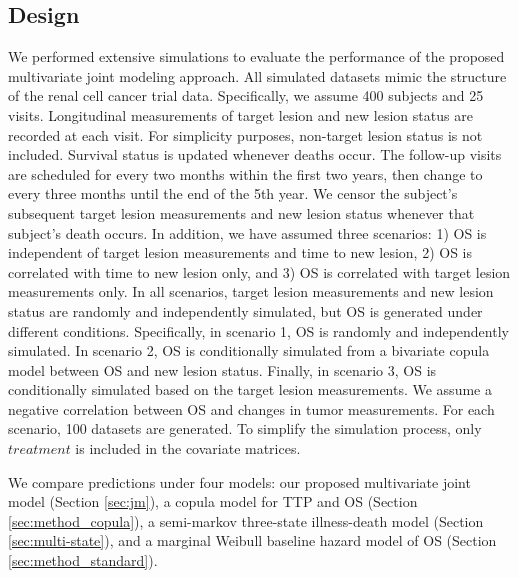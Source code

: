 \subsection{Design}
We performed extensive simulations to evaluate the performance of the proposed multivariate joint modeling approach. All simulated datasets mimic the structure of the renal cell cancer trial data. Specifically, we assume 400 subjects and 25 visits. Longitudinal measurements of target lesion and new lesion status are recorded at each visit. For simplicity purposes, non-target lesion status is not included. Survival status is updated whenever deaths occur. The follow-up visits are scheduled for every two months within the first two years, then change to every three months until the end of the 5th year. We censor the subject's subsequent target lesion measurements and new lesion status whenever that subject's death occurs. In addition, we have assumed three scenarios: 1) \ac{OS} is independent of target lesion measurements and time to new lesion, 2) \ac{OS} is correlated with time to new lesion only, and 3) \ac{OS} is correlated with target lesion measurements only. In all scenarios, target lesion measurements and new lesion status are randomly and independently simulated, but \ac{OS} is generated under different conditions. Specifically, in scenario 1, \ac{OS} is randomly and independently simulated. In scenario 2, \ac{OS} is conditionally simulated from a bivariate copula model between \ac{OS} and new lesion status. Finally, in scenario 3, \ac{OS} is conditionally simulated based on the target lesion measurements. We assume a negative correlation between \ac{OS} and changes in tumor measurements. For each scenario, 100 datasets are generated. To simplify the simulation process, only $treatment$ is included in the covariate matrices. 

We compare predictions under four models: our proposed multivariate joint model (Section \ref{sec:jm}), a copula model for \ac{TTP} and OS (Section \ref{sec:method_copula}), a semi-markov three-state illness-death model \citep{weber2020statistical} (Section \ref{sec:multi-state}), and a marginal Weibull baseline hazard model of OS (Section \ref{sec:method_standard}). 

